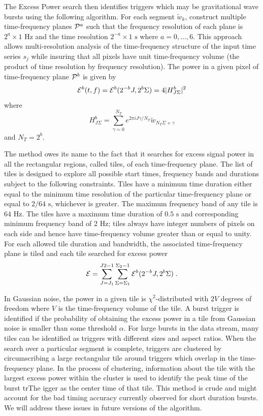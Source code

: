 The Excess Power search then identifies triggers which may be
gravitational wave bursts using the following algorithm.  For each
segment $\tilde{w}_k$,  construct multiple time-frequency planes
${\cal{P}}^a$ such that the frequency resolution of each plane is
$2^a \times 1 \textrm{ Hz}$ and the time resolution $2^{-a} \times 1
\textrm{ s}$ where $a=0,\ldots ,6$.  This approach allows
multi-resolution analysis of the time-frequency structure of the input
time series $s_j$ while insuring that all pixels have unit
time-frequency volume (the product of time resolution by frequency
resolution).   The power in a given pixel of time-frequency plane
${\cal{P}}^b$ is given by
\begin{equation}
{\cal E}^b(t,f) = {\cal E}^b( 2^{-b} J, 2^b \Sigma ) = 4 | H^b_{J\Sigma} |^2
\end{equation}
where 
\begin{equation}
H^b_{J\Sigma} = \sum_{\gamma=0}^{N_T} e^{ 2 \pi i J \gamma / N_T }
\tilde{w}_{N_T \Sigma + \gamma}
\end{equation}
and $N_T = 2^b$.

The method owes its name to the fact that it searches for excess
signal power in all the rectangular regions, called tiles, of each
time-frequency plane.  The list of tiles is designed to explore all
possible start times, frequency bands and durations subject to the
following constraints.  Tiles have a minimum time duration either
equal to the minimum time resolution of the particular time-frequency
plane or equal to $2/64 \textrm{ s}$,  whichever is greater.  The
maximum frequency band of any tile is $64 \textrm{ Hz}$.  The tiles
have a maximum time duration of $0.5 \textrm{ s}$ and corresponding
minimum frequency band of $2 \textrm{ Hz}$;  tiles always have integer
numbers of pixels on each side and hence have time-frequency volume
greater than or equal to unity.  For each allowed tile duration and
bandwidth,  the associated time-frequency plane is tiled and each tile
searched for excess power
\begin{equation}
{\cal{E}} = \sum_{J=J_1}^{J2-1} \sum_{\Sigma=\Sigma_1}^{\Sigma_2-1}
{\cal E}^b( 2^{-b} J , 2^b \Sigma ) \;.
\end{equation}

In Gaussian noise,  the power in a given tile is $\chi^2$-distributed
with $2 V$ degrees of freedom where $V$ is the time-frequency volume
of the tile.    A burst trigger is identified if the probability of
obtaining the excess power in a tile from Gaussian noise is smaller
than some threshold $\alpha$.   For large bursts in the data stream,
many tiles can be identified as triggers with different sizes and
aspect ratios.   When the search over a particular segment is
complete,   triggers are clustered by circumscribing a large
rectangular tile around triggers which overlap in the time-frequency
plane. In the process of clustering,  information about the tile
with the largest excess power within the cluster is used to identify
the peak time of the burst trThe igger as the center time of that tile.
This method is crude and might account for the bad timing accuracy
currently observed for short duration bursts.  We will address these
issues in future versions of the algorithm.
  
